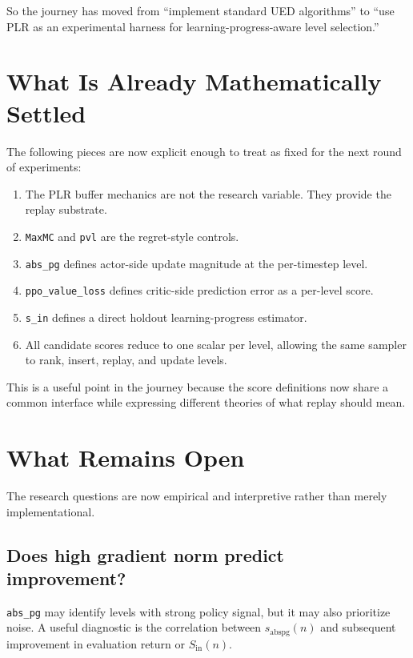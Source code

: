\documentclass[11pt]{article}
\begin{document}
So the journey has moved from ``implement standard UED algorithms'' to ``use PLR
as an experimental harness for learning-progress-aware level selection.''

\section{What Is Already Mathematically Settled}

The following pieces are now explicit enough to treat as fixed for the next
round of experiments:
\begin{enumerate}[leftmargin=*]
  \item The PLR buffer mechanics are not the research variable. They provide the replay substrate.
  \item \texttt{MaxMC} and \texttt{pvl} are the regret-style controls.
  \item \texttt{abs\_pg} defines actor-side update magnitude at the per-timestep level.
  \item \texttt{ppo\_value\_loss} defines critic-side prediction error as a per-level score.
  \item \texttt{s\_in} defines a direct holdout learning-progress estimator.
  \item All candidate scores reduce to one scalar per level, allowing the same sampler to rank, insert, replay, and update levels.
\end{enumerate}

This is a useful point in the journey because the score definitions now share a
common interface while expressing different theories of what replay should
mean.

\section{What Remains Open}

The research questions are now empirical and interpretive rather than merely
implementational.

\subsection{Does high gradient norm predict improvement?}

\texttt{abs\_pg} may identify levels with strong policy signal, but it may also
prioritize noise. A useful diagnostic is the correlation between
$s_{\mathrm{abspg}}(n)$
and subsequent improvement in evaluation return or $S_{\mathrm{in}}(n)$.
\end{document}
